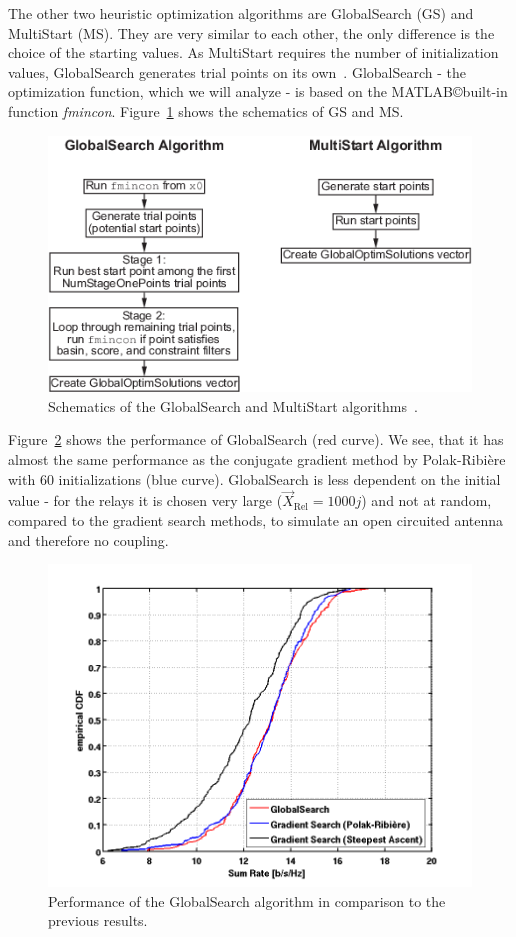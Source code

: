 The other two heuristic optimization algorithms are GlobalSearch (GS) and MultiStart (MS).
They are very similar to each other, the only difference is the choice of the starting values.
As MultiStart requires the number of initialization values, GlobalSearch generates trial points on its own~\cite{matlab:gloabls}.
GlobalSearch - the optimization function, which we will analyze - is based on the MATLAB\copyright  built-in function \textit{fmincon}.
Figure~\ref{fig:globals_scheme} shows the schematics of GS and MS.
\begin{figure}[h]
\centering
  \includegraphics[width=0.7\linewidth]{images/global_algorithm.png}
\caption{Schematics of the GlobalSearch and MultiStart algorithms~\cite{matlab:gloabls}.}
\label{fig:globals_scheme}
\end{figure}

Figure~\ref{fig:globals} shows the performance of GlobalSearch (red curve).
We see, that it has almost the same performance as the conjugate gradient method by Polak-Ribi\`{e}re with 60 initializations (blue curve).
GlobalSearch is less dependent on the initial value - for the relays it is chosen very large ($\vec{X}_{\text{Rel}} = 1000j$) and not at random, compared to the gradient search methods, to simulate an open circuited antenna and therefore no coupling.

\begin{figure}[h]
\centering
  \includegraphics[width=0.8\linewidth]{images/Globalscomparison_edited.png}
\caption{Performance of the GlobalSearch algorithm in comparison to the previous results.}
\label{fig:globals}
\end{figure}

